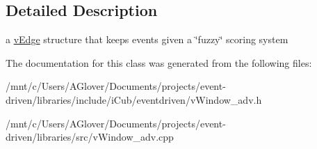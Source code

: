 \subsection{Detailed Description}
a \hyperlink{classev_1_1vEdge}{v\+Edge} structure that keeps events given a \char`\"{}fuzzy\char`\"{} scoring system 

The documentation for this class was generated from the following files\+:\begin{DoxyCompactItemize}
\item 
/mnt/c/\+Users/\+A\+Glover/\+Documents/projects/event-\/driven/libraries/include/i\+Cub/eventdriven/v\+Window\+\_\+adv.\+h\item 
/mnt/c/\+Users/\+A\+Glover/\+Documents/projects/event-\/driven/libraries/src/v\+Window\+\_\+adv.\+cpp\end{DoxyCompactItemize}
